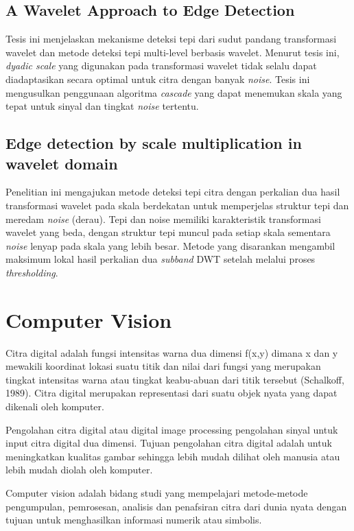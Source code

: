 \documentclass[laporan.tex]{subfiles}
\begin{document}
\subsection{A Wavelet Approach to Edge Detection}

Tesis ini menjelaskan mekanisme deteksi tepi dari sudut pandang transformasi wavelet dan metode deteksi tepi multi-level berbasis wavelet. Menurut tesis ini, \emph{dyadic scale} yang digunakan pada transformasi wavelet tidak selalu dapat diadaptasikan secara optimal untuk citra dengan banyak \emph{noise}. Tesis ini mengusulkan penggunaan algoritma \emph{cascade} yang dapat menemukan skala yang tepat untuk sinyal dan tingkat \emph{noise} tertentu.

\subsection{Edge detection by scale multiplication in wavelet domain}

Penelitian ini mengajukan metode deteksi tepi citra dengan perkalian dua hasil transformasi wavelet pada skala berdekatan untuk memperjelas struktur tepi dan meredam \emph{noise} (derau). Tepi dan noise memiliki karakteristik transformasi wavelet yang beda, dengan struktur tepi muncul pada setiap skala sementara \emph{noise} lenyap pada skala yang lebih besar. Metode yang disarankan mengambil maksimum lokal hasil perkalian dua \emph{subband} DWT setelah melalui proses \emph{thresholding}.

\section{Computer Vision}

Citra digital adalah fungsi intensitas warna dua dimensi f(x,y) dimana x dan y mewakili koordinat lokasi suatu titik dan nilai dari fungsi yang merupakan tingkat intensitas warna atau tingkat keabu-abuan dari titik tersebut (Schalkoff, 1989). Citra digital merupakan representasi dari suatu objek nyata yang dapat dikenali oleh komputer.

Pengolahan citra digital atau digital image processing pengolahan sinyal untuk input citra digital dua dimensi. Tujuan pengolahan citra digital adalah untuk meningkatkan kualitas gambar sehingga lebih mudah dilihat oleh manusia atau lebih mudah diolah oleh komputer.

Computer vision adalah bidang studi yang mempelajari metode-metode pengumpulan, pemrosesan, analisis dan penafsiran citra dari dunia nyata dengan tujuan untuk menghasilkan informasi numerik atau simbolis.
\end{document}
